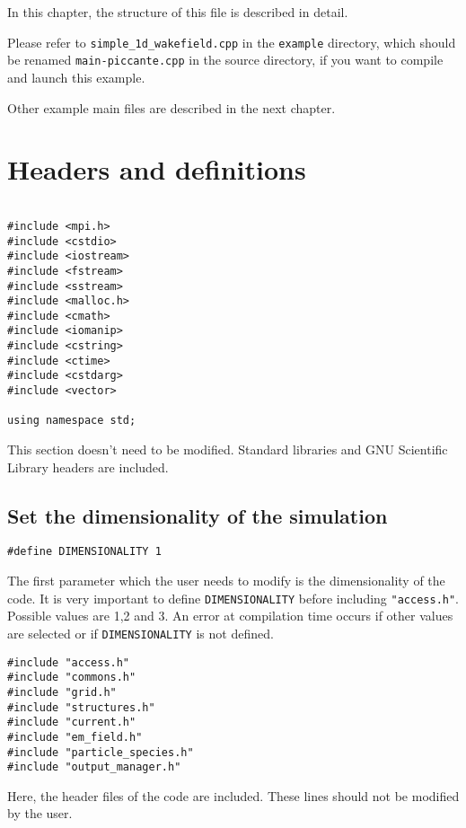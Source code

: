 \documentclass[11pt,a4paper]{report}
\begin{document}
In this chapter, the structure of this file is described in detail.

Please refer to \verb+simple_1d_wakefield.cpp+ in the \verb+example+ directory, which should be renamed \verb+main-piccante.cpp+ in the source directory, if you want to compile and launch this example.

Other example main files are described in the next chapter.

\section{Headers and definitions}
\begin{lstlisting}[backgroundcolor=\color{no_modify}]

#include <mpi.h>
#include <cstdio>
#include <iostream>
#include <fstream>
#include <sstream>
#include <malloc.h>
#include <cmath>
#include <iomanip>
#include <cstring>
#include <ctime>
#include <cstdarg> 
#include <vector>

using namespace std;
\end{lstlisting}
This section doesn't need to be modified. Standard libraries and GNU Scientific Library headers are included.


\subsection*{Set the dimensionality of the simulation}
\begin{lstlisting}
#define DIMENSIONALITY 1
\end{lstlisting}
The first parameter which the user needs to modify is the dimensionality of the code. It is very important to define \verb+DIMENSIONALITY+ before including \verb+"access.h"+. Possible values are 1,2 and 3. An error at compilation time occurs if other values are selected or if \verb+DIMENSIONALITY+ is not defined.
\begin{lstlisting}[backgroundcolor=\color{no_modify}]
#include "access.h"
#include "commons.h"
#include "grid.h"
#include "structures.h"
#include "current.h"
#include "em_field.h"
#include "particle_species.h"
#include "output_manager.h"
\end{lstlisting}
Here, the header files of the code are included. These lines should not be modified by the user.

\end{document}
